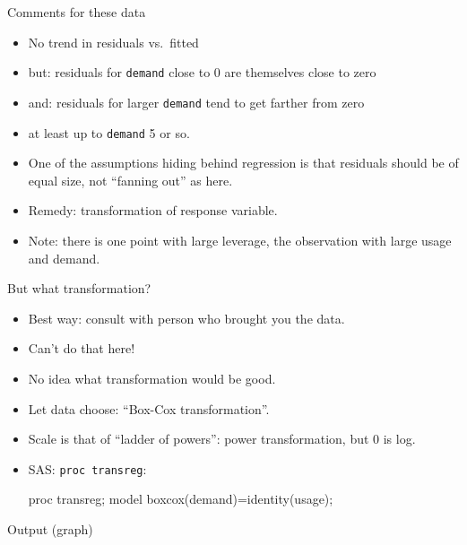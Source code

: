\documentclass[unknownkeysallowed]{beamer}\usepackage[]{graphicx}\usepackage[]{color}
\begin{document}
\begin{frame}[fragile]{Comments for these data}

  \begin{itemize}
  \item No trend in residuals vs.\ fitted
  \item but: residuals for \texttt{demand} close to 0 are themselves
    close to zero
  \item and: residuals for larger \texttt{demand} tend to get farther
    from zero
  \item at least up to \texttt{demand} 5 or so.
  \item One of the assumptions hiding behind regression is that
    residuals should be of equal size, not ``fanning out'' as here.
  \item Remedy: transformation of response variable.
  \item Note: there is one point with large leverage, the observation with
    large usage and demand.
  \end{itemize}
\end{frame}

\begin{frame}[fragile]{But what transformation?}

  \begin{itemize}
  \item Best way: consult with person who brought you the data.
  \item Can't do that here!
  \item No idea what transformation would be good.
  \item Let data choose: ``Box-Cox transformation''.
  \item Scale is that of ``ladder of powers'': power transformation,
    but 0 is log.
  \item SAS: \texttt{proc transreg}:
    \begin{Sascode}[store=dde]
proc transreg;
  model boxcox(demand)=identity(usage);        
    \end{Sascode}

  \end{itemize}
  
\end{frame}

% 
% 

\begin{frame}[fragile]{Output (graph)}
  
  
\end{frame}
\end{document}
